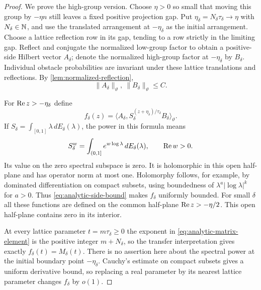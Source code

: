 \begin{proof}
We prove the high-group version.  Choose $\eta>0$ so small that
moving this group by $-\eta n$ still leaves a fixed positive
projection gap.  Put $\eta_\delta=N_\delta \tau_\delta\to\eta$ with
$N_\delta\in\mathbb N$, and use the translated arrangement at
$-\eta_\delta$ as the initial arrangement.  Choose a lattice
reflection row in its gap, tending to a row strictly in the
limiting gap.  Reflect and conjugate the normalized low-group
factor to obtain a positive-side Hilbert vector $A_\delta$;
denote the normalized high-group factor at $-\eta_\delta$ by
$B_\delta$.  Individual obstacle probabilities are invariant under
these lattice translations and reflections.  By
\cref{lem:normalized-reflection},
\begin{equation}\label{eq:analytic-side-bound}
 \|A_\delta\|_{\vartheta},\ \|B_\delta\|_{\vartheta}\le C.
\end{equation}

For $\operatorname{Re} z>-\eta_\delta$ define
\begin{equation}\label{eq:analytic-matrix-element}
 f_\delta(z)=
  \big\langle A_\delta,
  S_\delta^{(z+\eta_\delta)/\tau_\delta}B_\delta\big\rangle_{\vartheta}.
\end{equation}
If $S_\delta=\int_{[0,1]}\lambda\,dE_\delta(\lambda)$, the power
in this formula means
\[
 S_\delta^w=\int_{(0,1]}e^{w\log\lambda}\,dE_\delta(\lambda),
 \qquad \operatorname{Re} w>0.
\]
Its value on the zero spectral subspace is zero.  It is holomorphic
in this open half-plane and has operator norm at most one.
Holomorphy follows, for example, by dominated differentiation on
compact subsets, using boundedness of
$\lambda^a|\log\lambda|^k$ for $a>0$.  Thus
\eqref{eq:analytic-side-bound} makes $f_\delta$ uniformly bounded.
For small $\delta$ all these functions are defined on the common
half-plane $\operatorname{Re} z>-\eta/2$.  This open half-plane contains zero
in its interior.

At every lattice parameter $t=m\tau_\delta\ge0$ the exponent in
\eqref{eq:analytic-matrix-element} is the positive integer
$m+N_\delta$, so the transfer interpretation gives exactly
$f_\delta(t)=M_\delta(t)$.  There is no assertion here about the
spectral power at the initial boundary point $-\eta_\delta$.
Cauchy's estimate on compact subsets gives a uniform derivative
bound, so replacing a real parameter by its nearest lattice
parameter changes $f_\delta$ by $o(1)$.


\end{proof}
